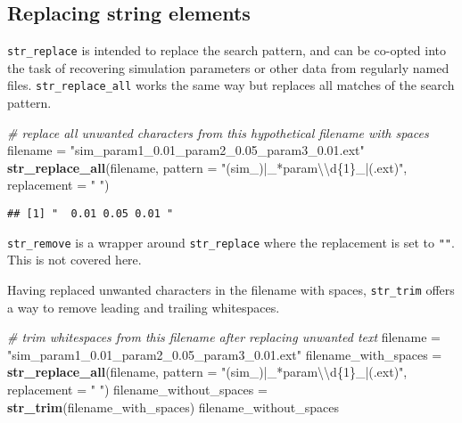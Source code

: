 \documentclass[
]{book}
\newenvironment{Shaded}{}{}
\newcommand{\CharTok}[1]{\textcolor[rgb]{0.25,0.44,0.63}{#1}}
\newcommand{\CommentTok}[1]{\textcolor[rgb]{0.38,0.63,0.69}{\textit{#1}}}
\newcommand{\DataTypeTok}[1]{\textcolor[rgb]{0.56,0.13,0.00}{#1}}
\newcommand{\KeywordTok}[1]{\textcolor[rgb]{0.00,0.44,0.13}{\textbf{#1}}}
\newcommand{\NormalTok}[1]{#1}
\newcommand{\StringTok}[1]{\textcolor[rgb]{0.25,0.44,0.63}{#1}}
\begin{document}
\hypertarget{replacing-string-elements}{%
\subsection{Replacing string elements}\label{replacing-string-elements}}

\texttt{str\_replace} is intended to replace the search pattern, and can be co-opted into the task of recovering simulation parameters or other data from regularly named files. \texttt{str\_replace\_all} works the same way but replaces all matches of the search pattern.

\begin{Shaded}
\begin{Highlighting}[]
\CommentTok{# replace all unwanted characters from this hypothetical filename with spaces}
\NormalTok{filename =}\StringTok{ "sim_param1_0.01_param2_0.05_param3_0.01.ext"}
\KeywordTok{str_replace_all}\NormalTok{(filename,}
                \DataTypeTok{pattern =} \StringTok{"(sim_)|_*param}\CharTok{\textbackslash{}\textbackslash{}}\StringTok{d\{1\}_|(.ext)"}\NormalTok{,}
                \DataTypeTok{replacement =} \StringTok{" "}\NormalTok{)}
\end{Highlighting}
\end{Shaded}

\begin{verbatim}
## [1] "  0.01 0.05 0.01 "
\end{verbatim}

\texttt{str\_remove} is a wrapper around \texttt{str\_replace} where the replacement is set to \texttt{""}. This is not covered here.

Having replaced unwanted characters in the filename with spaces, \texttt{str\_trim} offers a way to remove leading and trailing whitespaces.

\begin{Shaded}
\begin{Highlighting}[]
\CommentTok{# trim whitespaces from this filename after replacing unwanted text}
\NormalTok{filename =}\StringTok{ "sim_param1_0.01_param2_0.05_param3_0.01.ext"}
\NormalTok{filename_with_spaces =}\StringTok{ }\KeywordTok{str_replace_all}\NormalTok{(filename,}
                                       \DataTypeTok{pattern =} \StringTok{"(sim_)|_*param}\CharTok{\textbackslash{}\textbackslash{}}\StringTok{d\{1\}_|(.ext)"}\NormalTok{,}
                                       \DataTypeTok{replacement =} \StringTok{" "}\NormalTok{)}
\NormalTok{filename_without_spaces =}\StringTok{ }\KeywordTok{str_trim}\NormalTok{(filename_with_spaces)}
\NormalTok{filename_without_spaces}
\end{Highlighting}
\end{Shaded}
\end{document}
